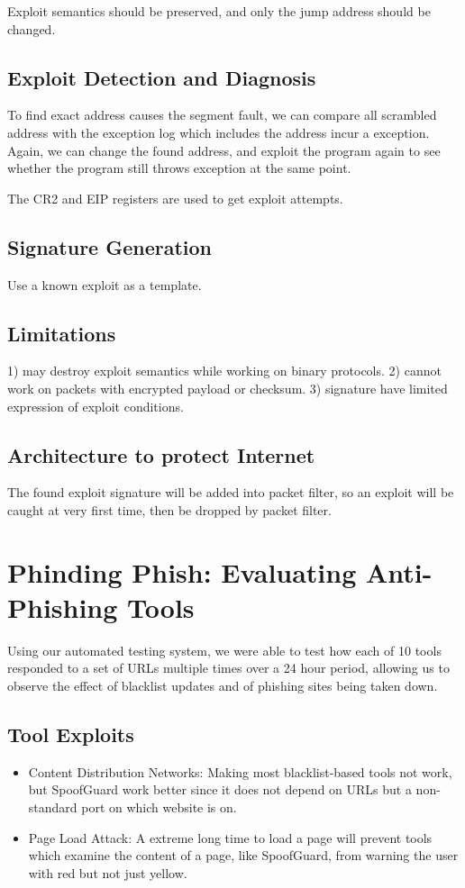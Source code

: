 \documentclass[]{article}
\begin{document}
Exploit semantics should be preserved, and only the jump address
should be changed.

\subsection{Exploit Detection and Diagnosis}
To find exact address causes the segment fault, we can compare all
scrambled address with the exception log which includes the address
incur a exception. Again, we can change the found address, and
exploit the program again to see whether the program still throws
exception at the same point.

The CR2 and EIP registers are used to get exploit attempts.

\subsection{Signature Generation}
Use a known exploit as a template.

\subsection{Limitations}
1) may destroy exploit semantics while working on binary protocols.
2) cannot work on packets with encrypted payload or checksum.
3) signature have limited expression of exploit conditions.

\subsection{Architecture to protect Internet}
The found exploit signature will be added into packet filter, so an 
exploit will be caught at very first time, then be dropped by packet
filter.

\section{Phinding Phish: Evaluating Anti-Phishing Tools}
 Using our automated testing system, we were able to test how each 
 of 10 tools responded to a set of URLs multiple times over a 24 hour 
 period, allowing us to observe the effect of blacklist updates and 
 of phishing sites being taken down.

\subsection{Tool Exploits}
\begin{itemize}
 \item Content Distribution Networks: Making most blacklist-based
 tools not work, but SpoofGuard work better since it does not depend
 on URLs but a non-standard port on which website is on.
 \item Page Load Attack: A extreme long time to load a page will
 prevent tools which examine the content of a page, like SpoofGuard,
 from warning the user with red but not just yellow.
\end{itemize}
\end{document}
